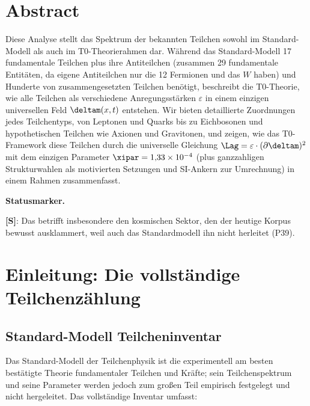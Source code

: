 \section*{Abstract}
		Diese Analyse stellt das Spektrum der bekannten Teilchen sowohl im Standard-Modell als auch im T0-Theorierahmen dar. Während das Standard-Modell 17 fundamentale Teilchen plus ihre Antiteilchen (zusammen 29 fundamentale Entitäten, da eigene Antiteilchen nur die 12 Fermionen und das $W$ haben) und Hunderte von zusammengesetzten Teilchen benötigt, beschreibt die T0-Theorie, wie alle Teilchen als verschiedene Anregungsstärken $\varepsilon$ in einem einzigen universellen Feld $\deltam(x,t)$ entstehen. Wir bieten detaillierte Zuordnungen jedes Teilchentyps, von Leptonen und Quarks bis zu Eichbosonen und hypothetischen Teilchen wie Axionen und Gravitonen, und zeigen, wie das T0-Framework diese Teilchen durch die universelle Gleichung $\Lag = \varepsilon \cdot (\partial \deltam)^2$ mit dem einzigen Parameter $\xipar = 1{,}33 \times 10^{-4}$ (plus ganzzahligen Strukturwahlen als motivierten Setzungen und SI-Ankern zur Umrechnung) in einem Rahmen zusammenfasst.

	\medskip\noindent\textbf{Statusmarker.}
	

	\noindent \textbf{[S]}: Das betrifft insbesondere den kosmischen Sektor, den der heutige Korpus bewusst ausklammert, weil auch das Standardmodell ihn nicht herleitet (P39).

	
	
	\section{Einleitung: Die vollständige Teilchenzählung}
	
	\subsection{Standard-Modell Teilcheninventar}
	
	Das Standard-Modell der Teilchenphysik ist die experimentell am besten bestätigte Theorie fundamentaler Teilchen und Kräfte; sein Teilchenspektrum und seine Parameter werden jedoch zum großen Teil empirisch festgelegt und nicht hergeleitet. Das vollständige Inventar umfasst:
	
